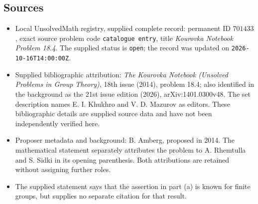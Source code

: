 \documentclass[11pt]{article}
\begin{document}
\subsection{Sources}
\begin{itemize}
\item Local UnsolvedMath registry, supplied complete record: permanent ID \(701433\), exact source problem code \texttt{catalogue entry}, title \emph{Kourovka Notebook Problem 18.4}. The supplied status is \texttt{open}; the record was updated on \texttt{2026-10-16T14:00:00Z}.
\item Supplied bibliographic attribution: \emph{The Kourovka Notebook (Unsolved Problems in Group Theory)}, 18th issue (2014), problem 18.4; also identified in the background as the 21st issue edition (2026), arXiv:1401.0300v48. The set description names E. I. Khukhro and V. D. Mazurov as editors. These bibliographic details are supplied source data and have not been independently verified here.
\item Proposer metadata and background: B. Amberg, proposed in 2014. The mathematical statement separately attributes the problem to A. Rhemtulla and S. Sidki in its opening parenthesis. Both attributions are retained without assigning further roles.
\item The supplied statement says that the assertion in part (a) is known for finite groups, but supplies no separate citation for that result.
\end{itemize}
\end{document}
